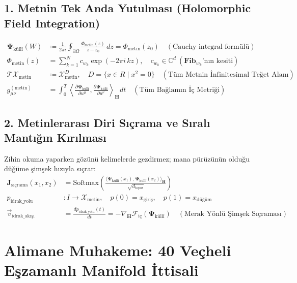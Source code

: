 \documentclass[11pt, a4paper]{article}
\begin{document}
\subsection{1. Metnin Tek Anda Yutulması (Holomorphic Field Integration)}
\begin{align}
\mathbf{\Psi}_{\text{küllî}}(W) &\coloneqq \frac{1}{2\pi i} \oint_{\partial \Omega} \frac{\Phi_{\text{metin}}(z)}{z - z_0} \, dz = \Phi_{\text{metin}}(z_0) \quad (\text{Cauchy integral formülü}) \\
\Phi_{\text{metin}}(z) &= \sum_{k=1}^N c_{w_k} \exp\left( -2\pi i \, k z \right), \quad c_{w_k} \in \mathbb{C}^d \ (\mathbf{Fib}_{w_k}\text{'nın kesiti}) \\
\mathcal{T}\mathcal{X}_{\text{metin}} &\coloneqq \mathcal{X}_{\text{metin}}^D, \quad D = \{x \in R \mid x^2 = 0\} \quad (\text{Tüm Metnin İnfinitesimal Teğet Alanı}) \\
g_{\mu\nu}^{(\text{metin})} &= \int_0^T \left\langle \frac{\partial \mathbf{\Psi}_{\text{küllî}}}{\partial u^\mu}, \frac{\partial \mathbf{\Psi}_{\text{küllî}}}{\partial u^\nu} \right\rangle_{\mathbf{H}} dt \quad (\text{Tüm Bağlamın İç Metriği})
\end{align}

\subsection{2. Metinlerarası Diri Sıçrama ve Sıralı Mantığın Kırılması}
Zihin okuma yaparken gözünü kelimelerde gezdirmez; mana pürüzünün olduğu düğüme şimşek hızıyla sıçrar:
\begin{align}
\mathbf{J}_{\text{sıçrama}}(x_1, x_2) &= \text{Softmax}\left( \frac{\langle \mathbf{\Psi}_{\text{küllî}}(x_1), \mathbf{\Psi}_{\text{küllî}}(x_2) \rangle_{\mathbf{H}}}{\sqrt{d_{\text{topos}}}} \right) \\
p_{\text{idrak\_yolu}} &: I \longrightarrow \mathcal{X}_{\text{metin}}, \quad p(0) = x_{\text{giriş}}, \quad p(1) = x_{\text{düğüm}} \\
\vec{v}_{\text{idrak\_akışı}} &= \frac{dp_{\text{idrak\_yolu}}(t)}{dt} = -\nabla_{\mathbf{H}} \mathcal{F}_{\text{iç}}(\mathbf{\Psi}_{\text{küllî}}) \quad (\text{Merak Yönlü Şimşek Sıçraması})
\end{align}

\section{Alimane Muhakeme: 40 Veçheli Eşzamanlı Manifold İttisali}
\end{document}
